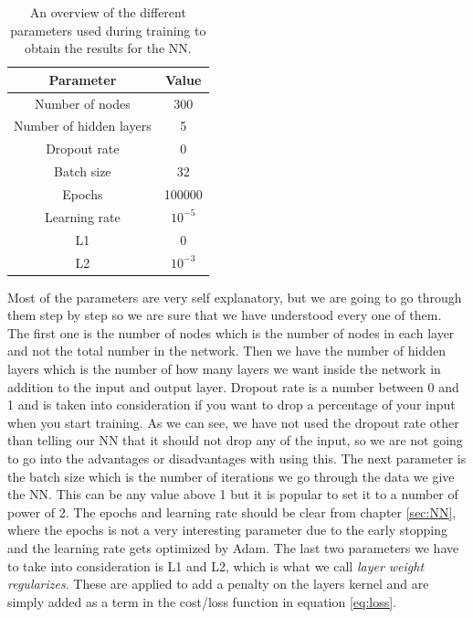 \begin{table}[H]
    \centering
    \renewcommand{\arraystretch}{1.}
    \begin{tabular}{c c}
    \toprule
        \textbf{Parameter} & \textbf{Value}\\
        \midrule
        \midrule
        Number of nodes & 300  \\
        Number of hidden layers & 5\\
        Dropout rate & 0\\
        Batch size & 32\\
        Epochs & 100000\\
        Learning rate & $10^{-5}$\\
        L1 & 0\\
        L2 & $10^{-3}$\\
        \bottomrule
    \end{tabular}
    \caption{An overview of the different parameters used during training to obtain the results for the NN.}
    \label{tab:parametersNN}
\end{table}

Most of the parameters are very self explanatory, but we are going to go through them step by step so we are sure that we have understood every one of them. The first one is the number of nodes which is the number of nodes in each layer and not the total number in the network. Then we have the number of hidden layers which is the number of how many layers we want inside the network in addition to the input and output layer. Dropout rate is a number between 0 and 1 and is taken into consideration if you want to drop a percentage of your input when you start training. As we can see, we have not used the dropout rate other than telling our NN that it should not drop any of the input, so we are not going to go into the advantages or disadvantages with using this. The next parameter is the batch size which is the number of iterations we go through the data we give the NN. This can be any value above 1 but it is popular to set it to a number of power of 2. The epochs and learning rate should be clear from chapter \ref{sec:NN}, where the epochs is not a very interesting parameter due to the early stopping and the learning rate gets optimized by Adam. The last two parameters we have to take into consideration is L1 and L2, which is what we call \textit{layer weight regularizes}. These are applied to add a penalty on the layers kernel and are simply added as a term in the cost/loss function in equation \ref{eq:loss}.


